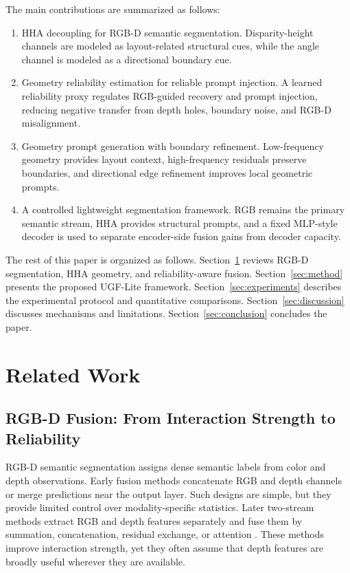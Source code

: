 \documentclass[a4paper,fleqn]{cas-dc}
\begin{document}
The main contributions are summarized as follows:
\begin{enumerate}
\item HHA decoupling for RGB-D semantic segmentation. Disparity-height channels are modeled as layout-related structural cues, while the angle channel is modeled as a directional boundary cue.
\item Geometry reliability estimation for reliable prompt injection. A learned reliability proxy regulates RGB-guided recovery and prompt injection, reducing negative transfer from depth holes, boundary noise, and RGB-D misalignment.
\item Geometry prompt generation with boundary refinement. Low-frequency geometry provides layout context, high-frequency residuals preserve boundaries, and directional edge refinement improves local geometric prompts.
\item A controlled lightweight segmentation framework. RGB remains the primary semantic stream, HHA provides structural prompts, and a fixed MLP-style decoder is used to separate encoder-side fusion gains from decoder capacity.
\end{enumerate}

The rest of this paper is organized as follows. Section~\ref{sec:related} reviews RGB-D segmentation, HHA geometry, and reliability-aware fusion. Section~\ref{sec:method} presents the proposed UGF-Lite framework. Section~\ref{sec:experiments} describes the experimental protocol and quantitative comparisons. Section~\ref{sec:discussion} discusses mechanisms and limitations. Section~\ref{sec:conclusion} concludes the paper.

\section{Related Work}\label{sec:related}

\subsection{RGB-D Fusion: From Interaction Strength to Reliability}

RGB-D semantic segmentation assigns dense semantic labels from color and depth observations. Early fusion methods concatenate RGB and depth channels or merge predictions near the output layer. Such designs are simple, but they provide limited control over modality-specific statistics. Later two-stream methods extract RGB and depth features separately and fuse them by summation, concatenation, residual exchange, or attention \citep{hazirbas2016fusenet,long2015fcn}. These methods improve interaction strength, yet they often assume that depth features are broadly useful wherever they are available.
\end{document}
